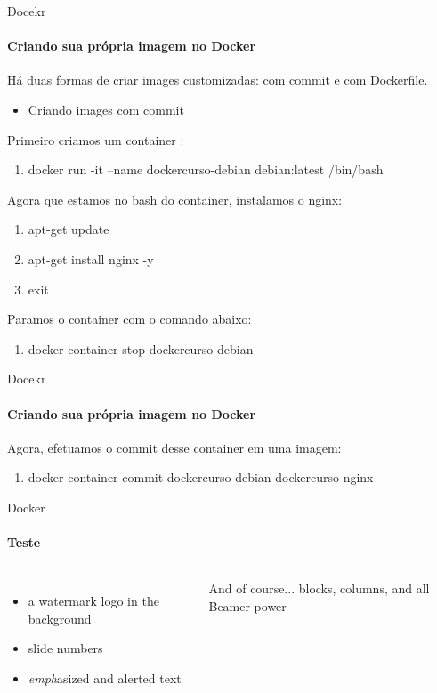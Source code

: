 \documentclass{beamer}
\begin{document}
\begin{frame}{Docekr}
    \framesubtitle{Criando sua pr\'opria imagem no Docker}
    Há duas formas de criar images customizadas: com commit e com Dockerfile.
    \begin{itemize}
        \item Criando images com commit
    \end{itemize}
    Primeiro criamos um container :
    \begin{enumerate}
        \item docker run -it --name dockercurso-debian debian:latest /bin/bash
    \end{enumerate} 
    Agora que estamos no bash do container, instalamos o nginx:
    \begin{enumerate}
        \item apt-get update
        \item apt-get install nginx -y
        \item exit
    \end{enumerate}
    Paramos o container com o comando abaixo:
    \begin{enumerate}
        \item docker container stop dockercurso-debian 
    \end{enumerate}
\end{frame}

\begin{frame}{Docekr}
    \framesubtitle{Criando sua pr\'opria imagem no Docker}
    Agora, efetuamos o commit desse container em uma imagem:
    \begin{enumerate}
        \item docker container commit dockercurso-debian dockercurso-nginx
    \end{enumerate}
\end{frame}
\begin{frame}{Docker}
  \framesubtitle{Teste}
  \begin{columns}
      \begin{itemize}
        \item a \alert{watermark} logo in the background
        \item slide \alert{numbers}
        \item \emph{emph}asized and \alert{alert}ed text
      \end{itemize}

      \begin{block}{And of course...}
         blocks, columns, and all Beamer power
      \end{block}
  \end{columns}
\end{frame}
\end{document}
